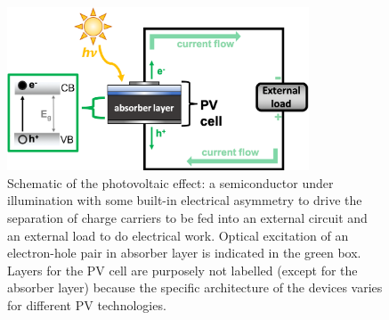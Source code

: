 \documentclass[11pt, twoside]{report}
\begin{document}
\begin{figure}[h!]
  \centering
    \includegraphics[width=0.8\textwidth]{figures/new_PV_schematic.png}
    \caption[Schematic of the photovoltaic effect: a semiconductor under illumination with some built-in electrical asymmetry to drive the separation of charge carriers to be fed into an external circuit and an external load to do electrical work. Optical excitation of an electron-hole pair in absorber layer is indicated in the green box. Layers for the PV cell are purposely not labelled (except for the absorber layer) because the specific architecture of the devices varies for different PV technologies.]{Schematic of the photovoltaic effect: a semiconductor under illumination with some built-in electrical asymmetry to drive the separation of charge carriers to be fed into an external circuit and an external load to do electrical work. Optical excitation of an electron-hole pair in absorber layer is indicated in the green box. Layers for the PV cell are purposely not labelled (except for the absorber layer) because the specific architecture of the devices varies for different PV technologies.}
  \label{PV_schematic}
\end{figure}
\end{document}
